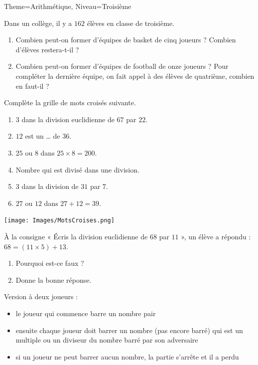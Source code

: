\documentclass[11pt]{article}
\begin{document}
\begin{multicols}{2}

\begin{Maquette}[Fiche]{Theme=Arithmétique, Niveau=Troisième}

\begin{exercice}
    Dans un collège, il y a $162$ élèves en classe de troisième.
    \begin{enumerate}
        \item Combien peut-on former d’équipes de basket de cinq joueurs ? Combien d’élèves restera-t-il ? 
        \item Combien peut-on former d’équipes de football de onze joueurs ? Pour compléter la dernière équipe, on fait appel à des élèves de quatrième, combien en faut-il ?
    \end{enumerate}
\end{exercice}

\begin{exercice}
    Complète la grille de mots croisés suivante.
    \begin{enumerate}
        \item $3$ dans la division euclidienne de $67$ par $22$.
        \item $12$ est un … de $36$.
        \item $25$ ou $8$ dans $25 \times 8 = 200$.
        \item Nombre qui est divisé dans une division.
        \item $3$ dans la division de $31$ par $7$.
        \item $27$ ou $12$ dans $27 + 12 = 39$.
    \end{enumerate}
    \texttt{[image: Images/MotsCroises.png]}

\end{exercice}

\begin{exercice}
    À la consigne « Écris la division euclidienne de $68$ par $11$ », un élève a répondu : $68 = (11 \times 5) + 13$.
    \begin{enumerate}
        \item Pourquoi est-ce faux ?
        \item Donne la bonne réponse.
    \end{enumerate}
\end{exercice}

\columnbreak 

\begin{exercice}[Titre=Jeu de Juniper Green]
    Version à deux joueurs :
    \begin{itemize}
        \item le joueur qui commence barre un nombre pair
        \item ensuite chaque joueur doit barrer un nombre (pas encore barré) qui est un multiple ou un diviseur du nombre barré par son adversaire
        \item si un joueur ne peut barrer aucun nombre, la partie s’arrête et il a perdu
    \end{itemize}


\end{exercice}
\end{Maquette}
\end{multicols}
\end{document}
